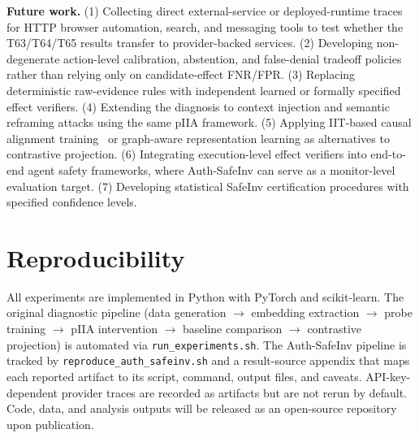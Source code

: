 \documentclass{article}
\begin{document}
\textbf{Future work.} (1) Collecting direct external-service or deployed-runtime traces for HTTP browser automation, search, and messaging tools to test whether the T63/T64/T65 results transfer to provider-backed services. (2) Developing non-degenerate action-level calibration, abstention, and false-denial tradeoff policies rather than relying only on candidate-effect FNR/FPR. (3) Replacing deterministic raw-evidence rules with independent learned or formally specified effect verifiers. (4) Extending the diagnosis to context injection and semantic reframing attacks using the same pIIA framework. (5) Applying IIT-based causal alignment training~\cite{geiger2022} or graph-aware representation learning as alternatives to contrastive projection. (6) Integrating execution-level effect verifiers into end-to-end agent safety frameworks, where Auth-SafeInv can serve as a monitor-level evaluation target. (7) Developing statistical SafeInv certification procedures with specified confidence levels.

\section{Reproducibility}

All experiments are implemented in Python with PyTorch and scikit-learn. The original diagnostic pipeline (data generation $\to$ embedding extraction $\to$ probe training $\to$ pIIA intervention $\to$ baseline comparison $\to$ contrastive projection) is automated via \texttt{run\_experiments.sh}. The Auth-SafeInv pipeline is tracked by \texttt{reproduce\_auth\_safeinv.sh} and a result-source appendix that maps each reported artifact to its script, command, output files, and caveats. API-key-dependent provider traces are recorded as artifacts but are not rerun by default. Code, data, and analysis outputs will be released as an open-source repository upon publication.
\end{document}
